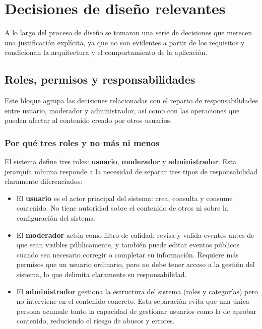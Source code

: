 \section{Decisiones de diseño relevantes}

A lo largo del proceso de diseño se tomaron una serie de decisiones que merecen una justificación explícita, ya que no son evidentes a partir de los requisitos y condicionan la arquitectura y el comportamiento de la aplicación.

\subsection{Roles, permisos y responsabilidades}

Este bloque agrupa las decisiones relacionadas con el reparto de responsabilidades entre usuario, moderador y administrador, así como con las operaciones que pueden afectar al contenido creado por otros usuarios.

\subsubsection{Por qué tres roles y no más ni menos}

El sistema define tres roles: \textbf{usuario}, \textbf{moderador} y \textbf{administrador}. Esta jerarquía mínima responde a la necesidad de separar tres tipos de responsabilidad claramente diferenciados:

\begin{itemize}
    \item El \textbf{usuario} es el actor principal del sistema: crea, consulta y consume contenido. No tiene autoridad sobre el contenido de otros ni sobre la configuración del sistema.
    \item El \textbf{moderador} actúa como filtro de calidad: revisa y valida eventos antes de que sean visibles públicamente, y también puede editar eventos públicos cuando sea necesario corregir o completar su información. Requiere más permisos que un usuario ordinario, pero no debe tener acceso a la gestión del sistema, lo que delimita claramente su responsabilidad.
    \item El \textbf{administrador} gestiona la estructura del sistema (roles y categorías) pero no interviene en el contenido concreto. Esta separación evita que una única persona acumule tanto la capacidad de gestionar usuarios como la de aprobar contenido, reduciendo el riesgo de abusos y errores.
\end{itemize}

